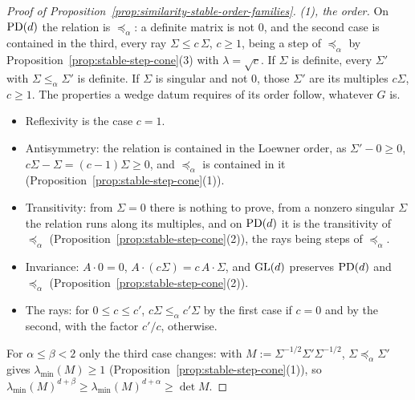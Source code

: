 \begin{proof}[Proof of Proposition~\ref{prop:similarity-stable-order-families}]
\emph{(1), the order.} On $\mathrm{PD}(d)$ the relation is $\preceq_\alpha$: a definite matrix is not $0$, and
the second case is contained in the third, every ray $\Sigma \le c\,\Sigma$, $c \ge 1$, being a step of
$\preceq_\alpha$ by Proposition~\ref{prop:stable-step-cone}(3) with $\lambda = \sqrt c$. If $\Sigma$ is definite, every
$\Sigma'$ with $\Sigma \le_\alpha \Sigma'$ is definite. If $\Sigma$ is singular and not $0$, those $\Sigma'$
are its multiples $c\Sigma$, $c \ge 1$. The properties a wedge datum requires of its order follow, whatever
$G$ is.
\begin{itemize}
\item Reflexivity is the case $c = 1$.
\item Antisymmetry: the relation is contained in the Loewner order, as $\Sigma' - 0 \ge 0$,
$c\Sigma - \Sigma = (c-1)\Sigma \ge 0$, and $\preceq_\alpha$ is contained in it
(Proposition~\ref{prop:stable-step-cone}(1)).
\item Transitivity: from $\Sigma = 0$ there is nothing to prove, from a nonzero singular $\Sigma$ the
relation runs along its multiples, and on $\mathrm{PD}(d)$ it is the transitivity of $\preceq_\alpha$
(Proposition~\ref{prop:stable-step-cone}(2)), the rays being steps of $\preceq_\alpha$.
\item Invariance: $A\cdot 0 = 0$, $A\cdot(c\Sigma) = c\,A\cdot\Sigma$, and $\mathrm{GL}(d)$ preserves $\mathrm{PD}(d)$ and
$\preceq_\alpha$ (Proposition~\ref{prop:stable-step-cone}(2)).
\item The rays: for $0 \le c \le c'$, $c\Sigma \le_\alpha c'\Sigma$ by the first case if $c = 0$ and by the
second, with the factor $c'/c$, otherwise.
\end{itemize}
For $\alpha \le \beta < 2$ only the third case changes: with $M := \Sigma^{-1/2}\Sigma'\Sigma^{-1/2}$,
$\Sigma \preceq_\alpha \Sigma'$ gives $\lambda_{\min}(M) \ge 1$ (Proposition~\ref{prop:stable-step-cone}(1)), so
$\lambda_{\min}(M)^{d+\beta} \ge \lambda_{\min}(M)^{d+\alpha} \ge \det M$.


\end{proof}
